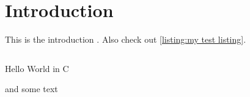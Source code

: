 \section{Introduction}
\label{sec:introduction}

This is the introduction \cite{latex2e}. Also check out \autoref{listing:my test listing}.


\begin{listing}
    \inputminted{c}{assets/listings/hello.c}
    \caption{Hello World in C}
    \label{listing:my test listing}
\end{listing}


and some text